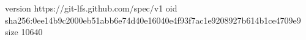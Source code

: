 version https://git-lfs.github.com/spec/v1
oid sha256:0ee14b9c2000eb51abb6e74d40e16040e4f93f7ac1e9208927b614b1ce4709e9
size 10640
